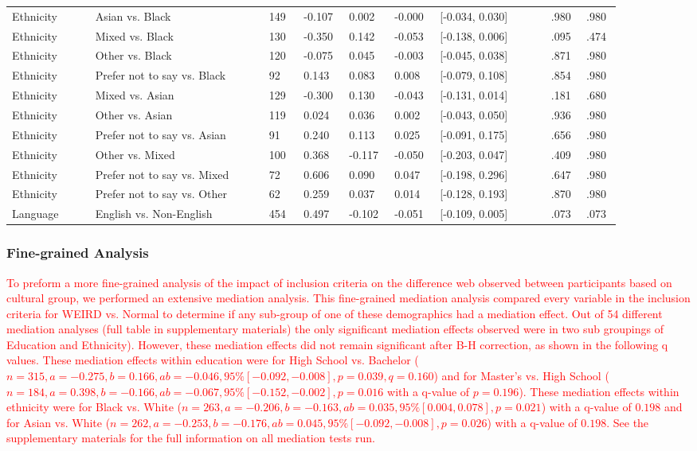 {\begin{longtable}{L{0.12\linewidth}L{0.25\linewidth}R{0.05\linewidth}R{0.065\linewidth}R{0.065\linewidth}R{0.065\linewidth}R{0.16\linewidth}R{0.055\linewidth}R{0.055\linewidth}}
Ethnicity & Asian vs. Black & 149 & -0.107 & 0.002 & -0.000 & [-0.034, 0.030] & .980 & .980 \\
Ethnicity & Mixed vs. Black & 130 & -0.350 & 0.142 & -0.053 & [-0.138, 0.006] & .095 & .474 \\
Ethnicity & Other vs. Black & 120 & -0.075 & 0.045 & -0.003 & [-0.045, 0.038] & .871 & .980 \\
Ethnicity & Prefer not to say vs. Black & 92 & 0.143 & 0.083 & 0.008 & [-0.079, 0.108] & .854 & .980 \\
Ethnicity & Mixed vs. Asian & 129 & -0.300 & 0.130 & -0.043 & [-0.131, 0.014] & .181 & .680 \\
Ethnicity & Other vs. Asian & 119 & 0.024 & 0.036 & 0.002 & [-0.043, 0.050] & .936 & .980 \\
Ethnicity & Prefer not to say vs. Asian & 91 & 0.240 & 0.113 & 0.025 & [-0.091, 0.175] & .656 & .980 \\
Ethnicity & Other vs. Mixed & 100 & 0.368 & -0.117 & -0.050 & [-0.203, 0.047] & .409 & .980 \\
Ethnicity & Prefer not to say vs. Mixed & 72 & 0.606 & 0.090 & 0.047 & [-0.198, 0.296] & .647 & .980 \\
Ethnicity & Prefer not to say vs. Other & 62 & 0.259 & 0.037 & 0.014 & [-0.128, 0.193] & .870 & .980 \\
\midrule
Language & English vs. Non-English & 454 & 0.497 & -0.102 & -0.051 & [-0.109, 0.005] & .073 & .073 \\
\bottomrule
\end{longtable}
}


\subsubsection{Fine-grained Analysis}
\textcolor{red}{To preform a more fine-grained analysis of the impact of inclusion criteria on the difference web observed between participants based on cultural group, we performed an extensive mediation analysis. This fine-grained mediation analysis compared every variable in the inclusion criteria for WEIRD vs. Normal to determine if any sub-group of one of these demographics had a mediation effect. Out of 54 different mediation analyses (full table in supplementary materials) the only significant mediation effects observed were in two sub groupings of Education and Ethnicity). However, these mediation effects did not remain significant after B-H correction, as shown in the following q values. These mediation effects within education were for High School vs. Bachelor ($n=315, a=-0.275, b=0.166, ab = -0.046, 95\%[-0.092, -0.008], p =0.039, q=0.160$) and for Master's vs. High School ($n=184, a=0.398, b=-0.166, ab=-0.067, 95\%[-0.152, -0.002], p =0.016$ with a q-value of $p=0.196$). These mediation effects within ethnicity were for Black vs. White ($n=263, a=-0.206, b=-0.163, ab=0.035, 95\%[0.004, 0.078], p=0.021$) with a q-value of $0.198$ and for Asian vs. White ($n=262, a=-0.253, b=-0.176, ab=0.045,95\%[-0.092, -0.008], p=0.026$) with a q-value of $0.198$. See the supplementary materials for the full information on all mediation tests run. }